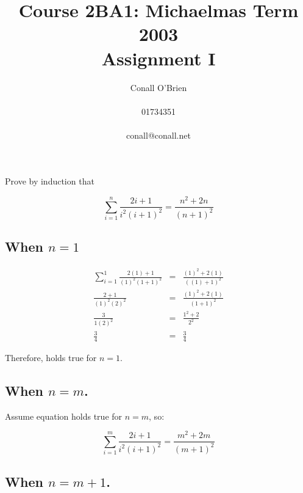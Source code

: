 \documentclass[a4paper,12pt]{article}
\begin{document}
\title{Course 2BA1: Michaelmas Term 2003 \\ Assignment I}

\author{Conall O'Brien \\ \\ 01734351 \\ \\ conall@conall.net}

\maketitle

\section{}

Prove by induction that

\[ \sum^{n}_{i = 1} \frac{2i + 1}{i^{2}(i + 1)^{2}} = 
\frac{n^{2} + 2n}{(n + 1)^{2}} \]

\subsection{When $n = 1$}

\begin{eqnarray*}
\sum^{1}_{i = 1} \frac{2(1) + 1}{(1)^{2}(1 + 1)^{2}} 
& = &\frac{(1)^{2} + 2(1)}{((1) + 1)^{2}} \\
\frac{2 + 1}{(1)^{2}(2)^{2}} 
& = & \frac{(1)^{2} + 2(1)}{(1 + 1)^{2}} \\
\frac{3}{1(2)^{2}} 
& = & \frac{1^{2} + 2}{2^{2}} \\
\frac{3}{4} 
& = & \frac{3}{4}
\end{eqnarray*}

\noindent Therefore, holds true for $n = 1$.

\subsection{When $n = m$.}

Assume equation holds true for $n = m$, so:

\[ \sum^{m}_{i = 1} \frac{2i + 1}{i^{2}(i + 1)^{2}} = 
\frac{m^{2} + 2m}{(m + 1)^{2}} \]

\subsection{When $n = m + 1$.}
\end{document}
